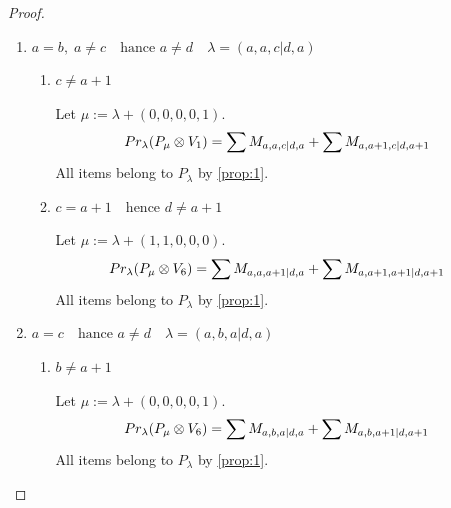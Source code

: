 \begin{proof}
\begin{enumerate}
    \item $a=b,\; a \neq c  \quad \text{hance } a\neq d  \quad \lambda = (a,a,c|d,a)$ 
      \begin{enumerate}
        \item $c \neq a+1 $ \par
        Let $\mu:=\lambda + (0,0,0,0,1) $.
        \begin{equation}\notag
          \begin{aligned}
            Pr_{\lambda}(P_\mu \otimes V_{1}) &=
\sum M_{a,a,c|d,a}
+ \sum M_{a,a+1,c|d,a+1}
          \end{aligned}
        \end{equation}
All items belong to $P_\lambda$ by \cref{prop:1}.

        \item $c = a+1 \quad \text{hence }d \neq a+1 $\par
        Let $\mu:=\lambda + (1,1,0,0,0) $.
        \begin{equation}\notag
          \begin{aligned}
            Pr_{\lambda}(P_\mu \otimes V_{6}) &=
\sum M_{a,a,a+1|d,a}
+ \sum M_{a,a+1,a+1|d,a+1}
          \end{aligned}
        \end{equation}
All items belong to $P_\lambda$ by \cref{prop:1}.
      \end{enumerate}

    \item $a=c  \quad \text{hance } a\neq d  \quad \lambda = (a,b,a|d,a)$ 
      \begin{enumerate}
        \item $ b \neq a+1 $\par
        Let $\mu:=\lambda + (0,0,0,0,1) $.
        \begin{equation}\notag
          \begin{aligned}
            Pr_{\lambda}(P_\mu \otimes V_{6}) &=
\sum M_{a,b,a|d,a}
+ \sum M_{a,b,a+1|d,a+1}
          \end{aligned}
        \end{equation}
All items belong to $P_\lambda$ by \cref{prop:1}.


\end{enumerate}
\end{enumerate}
\end{proof}
